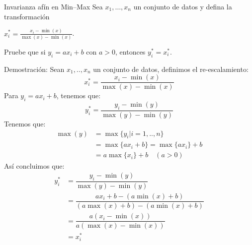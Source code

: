 \documentclass[a4paper,11pt]{article}
\begin{document}
\newpage
\begin{ejercicio}{8}
    Invarianza afín en Min--Max
    Sea $x_1, \ldots, x_n$ un conjunto de datos y defina la transformación

    $x_i^* = \frac{x_i - \min(x)}{\max(x) - \min(x)}$.

    Pruebe que si $y_i = ax_i + b$ con $a > 0$, entonces $y_i^* = x_i^*$.
\end{ejercicio}
\begin{demostracion}{Demostración:}
    Sean $x_1,..,x_n$ un conjunto de datos, definimos el re-escalamiento:
    \[
        x_i^*=\dfrac{x_i-\min(x)}{\max(x)-\min(x)}
    \]
    Para $y_i=a x_i+b$, tenemos que:
    \[
        y_i^*=\dfrac{y_i-\min(y)}{\max(y)-\min(y)}
    \]
    Tenemos que:
    \begin{align*}
        \max (y) & =\max \{y_i| i=1,..,n\}            \\
                 & =\max\{ ax_i+b \}=\max\{ ax_i \}+b \\
                 & =a\max\{ x_i \}+b  \quad (a>0)
    \end{align*}
    Así concluimos que:
    \begin{align*}
        y_i^* & =\dfrac{y_i-\min(y)}{\max(y)-\min(y)}                   \\
              & =\dfrac{ax_i+b-(a\min(x)+b)}{(a\max(x)+b)-(a\min(x)+b)} \\
              & =\dfrac{a(x_i-\min(x))}{a(\max(x)-\min(x))}             \\
              & =x_i^*
    \end{align*}
\end{demostracion}
\newpage
\end{document}
